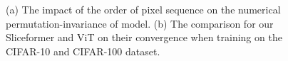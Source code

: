 \begin{figure}[t]
  \centering
  \caption{
  (a) The impact of the order of pixel sequence on the numerical permutation-invariance of model.
  (b) The comparison for our Sliceformer and ViT on their convergence when training on the CIFAR-10 and CIFAR-100 dataset.
  }
\end{figure}

